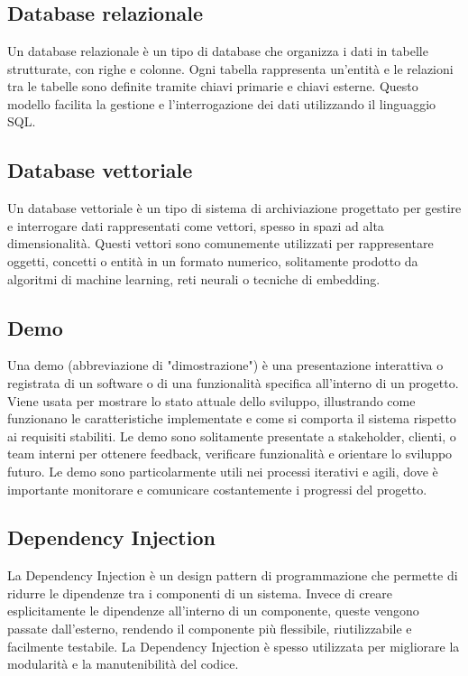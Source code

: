 
\section{}

\hypertarget{sec:database_relazionale}{}
\subsection*{Database relazionale}
Un database relazionale è un tipo di database che organizza i dati in tabelle strutturate, con righe e colonne. Ogni tabella rappresenta un'entità e le 
relazioni tra le tabelle sono definite tramite chiavi primarie e chiavi esterne. Questo modello facilita la gestione e l'interrogazione dei dati utilizzando 
il linguaggio SQL.

\hypertarget{sec:database_vettoriale}{}
\subsection*{Database vettoriale}
Un database vettoriale è un tipo di sistema di archiviazione progettato per gestire e interrogare dati rappresentati come vettori, spesso in spazi ad 
alta dimensionalità. Questi vettori sono comunemente utilizzati per rappresentare oggetti, concetti o entità in un formato numerico, solitamente prodotto 
da algoritmi di machine learning, reti neurali o tecniche di embedding.

\hypertarget{sec:demo}{}
\subsection*{Demo}
Una demo (abbreviazione di "dimostrazione") è una presentazione interattiva o registrata di un software o di una funzionalità specifica all'interno di un 
progetto. Viene usata per mostrare lo stato attuale dello sviluppo, illustrando come funzionano le caratteristiche implementate e come si comporta il 
sistema rispetto ai requisiti stabiliti. Le demo sono solitamente presentate a stakeholder, clienti, o team interni per ottenere feedback, verificare 
funzionalità e orientare lo sviluppo futuro. Le demo sono particolarmente utili nei processi iterativi e agili, dove è importante monitorare e comunicare 
costantemente i progressi del progetto.

\hypertarget{sec:dependency_injection}{}
\subsection*{Dependency Injection}
La Dependency Injection è un design pattern di programmazione che permette di ridurre le dipendenze tra i componenti di un sistema. Invece di creare
esplicitamente le dipendenze all'interno di un componente, queste vengono passate dall'esterno, rendendo il componente più flessibile, riutilizzabile e
facilmente testabile. La Dependency Injection è spesso utilizzata per migliorare la modularità e la manutenibilità del codice.

